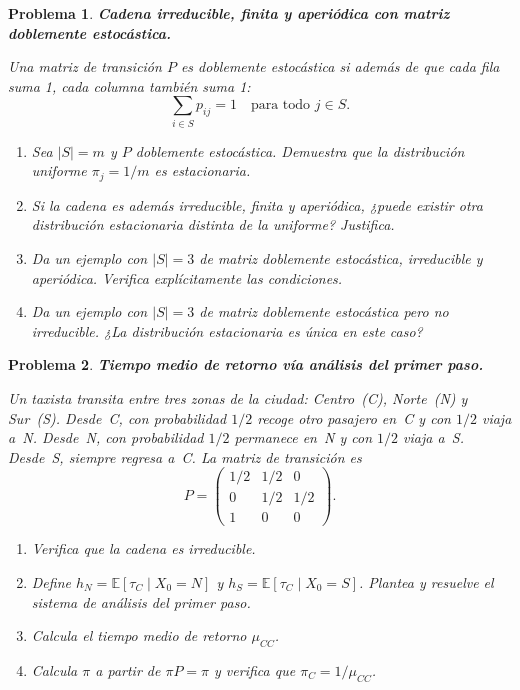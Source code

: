 \documentclass[12pt]{article}
\newtheorem{problem}{Problema}
\begin{document}
\begin{problem}
\textbf{Cadena irreducible, finita y aperiódica con matriz doblemente estocástica.}

Una matriz de transición $P$ es \emph{doblemente estocástica} si además de que cada fila suma 1, cada columna también suma 1:
\[
    \sum_{i \in S} p_{ij} = 1 \quad \text{para todo } j \in S.
\]

\begin{enumerate}
    \item[(a)] Sea $|S| = m$ y $P$ doblemente estocástica. Demuestra que la distribución uniforme $\pi_j = 1/m$ es estacionaria.

    \item[(b)] Si la cadena es además irreducible, finita y aperiódica, ¿puede existir otra distribución estacionaria distinta de la uniforme? Justifica.

    \item[(c)] Da un ejemplo con $|S| = 3$ de matriz doblemente estocástica, irreducible y aperiódica. Verifica explícitamente las condiciones.

    \item[(d)] Da un ejemplo con $|S| = 3$ de matriz doblemente estocástica pero \emph{no} irreducible. ¿La distribución estacionaria es única en este caso?
\end{enumerate}
\end{problem}

\begin{problem}
\textbf{Tiempo medio de retorno vía análisis del primer paso.}

Un taxista transita entre tres zonas de la ciudad: Centro~(C), Norte~(N) y Sur~(S). Desde~C, con probabilidad $1/2$ recoge otro pasajero en~C y con $1/2$ viaja a~N. Desde~N, con probabilidad $1/2$ permanece en~N y con $1/2$ viaja a~S. Desde~S, siempre regresa a~C. La matriz de transición es
\[
    P = \begin{pmatrix}
        1/2 & 1/2 & 0   \\
        0   & 1/2 & 1/2 \\
        1   & 0   & 0
    \end{pmatrix}.
\]
\begin{enumerate}
    \item[(a)] Verifica que la cadena es irreducible.
    \item[(b)] Define $h_N = \mathbb{E}[\tau_C \mid X_0 = N]$ y $h_S = \mathbb{E}[\tau_C \mid X_0 = S]$. Plantea y resuelve el sistema de análisis del primer paso.
    \item[(c)] Calcula el tiempo medio de retorno $\mu_{CC}$.
    \item[(d)] Calcula $\pi$ a partir de $\pi P = \pi$ y verifica que $\pi_C = 1/\mu_{CC}$.
\end{enumerate}
\end{problem}
\end{document}
